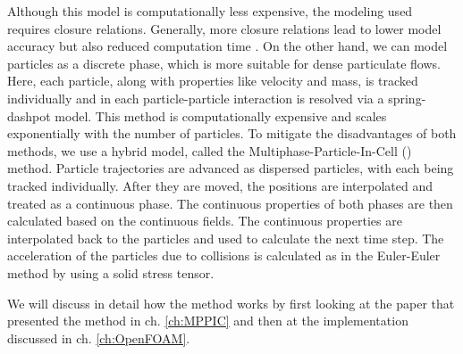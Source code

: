Although this model is computationally less expensive, the modeling used requires closure relations. Generally, more closure relations lead to lower model accuracy but also reduced computation time \cite{mathMPPIC}.
On the other hand, we can model particles as a discrete phase, which is more suitable for dense particulate flows.
Here, each particle, along with properties like velocity and mass, is tracked individually and in \OF each particle-particle interaction is resolved via a spring-dashpot model. This method is computationally expensive and scales exponentially with the number of particles.
To mitigate the disadvantages of both methods, we use a hybrid model, called the Multiphase-Particle-In-Cell (\MPns) method.
Particle trajectories are advanced as dispersed particles, with each being tracked individually. After they are moved, the positions are interpolated and treated as a continuous phase. 
The continuous properties of both phases are then calculated based on the continuous fields. The continuous properties are interpolated back to the particles and used to calculate the next time step.
The acceleration of the particles due to collisions is calculated as in the Euler-Euler method by using a solid stress tensor.





\color{black}

We will discuss in detail how the \MP method works by first looking at the paper that presented the method in ch. \ref{ch:MPPIC} and then at the \OF implementation discussed in ch. \ref{ch:OpenFOAM}.





